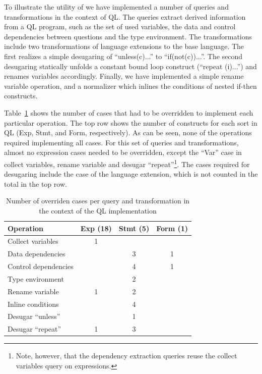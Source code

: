 To illustrate the utility of \name we have implemented a number of queries and transformations in the context of QL. The queries extract derived information from a QL program, such as the set of used variables, the data and control dependencies between questions and the type environment.
The transformations include two transformations of language extensions to the base language.
The first realizes a simple desugaring of ``unless(c){...}'' to ``if(not(c)){...}''.
The second desugaring statically unfolds a constant bound loop construct (``repeat (i){...}'') and renames variables accordingly.
Finally, we have implemented a simple rename variable operation, and a normalizer which inlines the conditions of nested if-then constructs.  

Table~\ref{TBL:qlresults} shows the number of cases that had to be overridden to implement each particular operation. The top row shows the number of  constructs for each sort in QL (Exp, Stmt, and Form, respectively).
As can be seen, none of the operations required implementing all cases.
For this set of queries and transformations, almost no expression cases needed to be overridden, except the ``Var'' case in collect variables, rename variable and desugar ``repeat''\footnote{Note, however, that the dependency extraction queries reuse the collect variables query on expressions.}.
The cases required for desugaring include the case of the language extension, which is not counted in the total in the top row. 

\begin{table}[t]
  \centering
  \begin{tabular}{l|c|c|c}
    Operation            & Exp (18) & Stmt (5) & Form (1) \\\hline
    Collect variables    & 1              &                &               \\
    Data dependencies    &                & 3               & 1             \\
    Control dependencies &                & 4              & 1             \\
    Type environment     &                & 2              &               \\\hline
    Rename variable      & 1              & 2              &               \\
    Inline conditions    &                & 4              &               \\
    Desugar ``unless''   &                & 1              &               \\
    Desugar ``repeat''   & 1              & 3              &               \\
  \end{tabular}
  \caption{Number of overriden cases per query and transformation in
    the context of the QL implementation\label{TBL:qlresults}}
\end{table}


